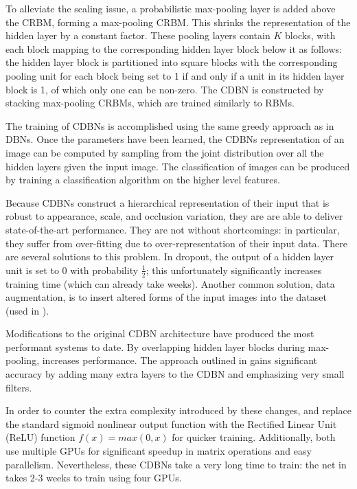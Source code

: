 \documentclass[10pt,twocolumn,letterpaper]{article}
\begin{document}
To alleviate the scaling issue, a probabilistic max-pooling layer is added above the CRBM,
forming a max-pooling CRBM.
This shrinks the representation of the hidden layer by a constant factor.
These pooling layers contain $K$ blocks, with each block mapping to the corresponding hidden
layer block below it as follows: the hidden layer block is partitioned into square blocks with the
corresponding pooling unit for each block being set to 1 if and only if a unit in its hidden layer
block is 1, of which only one can be non-zero.
The CDBN is constructed by stacking max-pooling CRBMs,
which are trained similarly to RBMs.

The training of CDBNs is accomplished using the same greedy approach as in DBNs.
Once the parameters have been learned, the CDBNs representation of an image can be computed
by sampling from the joint distribution over all the hidden layers given the input image.
The classification of images can be produced by training a classification algorithm
on the higher level features.

Because CDBNs construct a hierarchical representation of their input that is robust
to appearance, scale, and occlusion variation, they are are able to deliver
state-of-the-art performance.
They are not without shortcomings: in particular, they suffer from over-fitting due
to over-representation of their input data.
There are several solutions to this problem. In dropout, the output of a hidden layer
unit is set to 0 with probability $\frac{1}{2}$; this unfortunately significantly increases training
time (which can already take weeks). Another common solution, data augmentation,
is to insert altered forms of the input images into the dataset (used in \cite{Verydeep}).

Modifications to the original CDBN architecture \cite{CDBN} have produced the most performant
systems to date.
By overlapping hidden layer blocks during max-pooling, \cite{ImageNet} increases performance.
The approach outlined in \cite{Verydeep} gains significant accuracy by adding many extra layers
to the CDBN and emphasizing very small filters.

In order to counter the extra complexity introduced by these changes,
\cite{ImageNet} and \cite{Verydeep} replace the standard sigmoid nonlinear output function with the
Rectified Linear Unit (ReLU) function $f(x) = max(0, x)$ for quicker training.
Additionally, both use multiple GPUs for significant speedup in matrix operations
and easy parallelism.
Nevertheless, these CDBNs take a very long time to train: the net in \cite{Verydeep}
takes 2-3 weeks to train using four GPUs.
\end{document}
